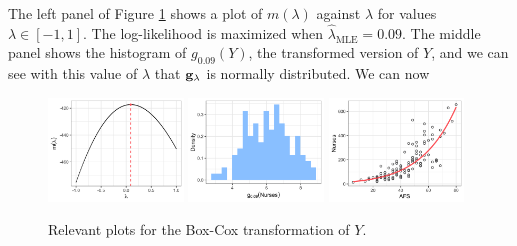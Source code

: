 \documentclass[10pt]{article}
\begin{document}
\begin{itemize}
    The left panel of Figure \ref{q01-box-cox} shows a plot of \(m(\lambda)\) against \(\lambda\) for values \(\lambda \in [-1, 1]\). The log-likelihood is maximized when \(\hat{\lambda}_{\mathrm{MLE}} = 0.09\).
    The middle panel shows the histogram of \(g_{0.09}(Y)\), the transformed version of \(Y\), and we can see with this value of \(\lambda\) that \(\mathbf{g}_{\lambda}\) is normally distributed. 
    We can now 
    \begin{figure}
        \centering
        \includegraphics[width = 0.32\textwidth]{img/q01-box-cox-lambda.png}
        \includegraphics[width = 0.32\textwidth]{img/q01-nurses-hist-transformed.png}
        \includegraphics[width = 0.32\textwidth]{img/q01-scatterplot-model.png}
        \caption{Relevant plots for the Box-Cox transformation of \(Y\).}
        \label{q01-box-cox}
    \end{figure}
\end{itemize}
\end{document}
